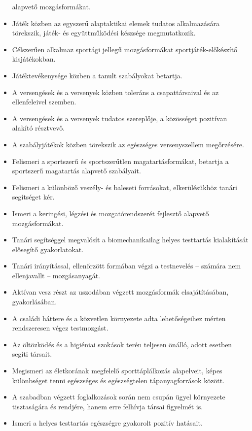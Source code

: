 \begin{itemize}
  alapvető mozgásformákat.
\item
  Játék közben az egyszerű alaptaktikai elemek tudatos alkalmazására
  törekszik, játék- és együttműködési készsége megmutatkozik.
\item
  Célszerűen alkalmaz sportági jellegű mozgásformákat
  sportjáték-előkészítő kisjátékokban.
\item
  Játéktevékenysége közben a tanult szabályokat betartja.
\item
  A versengések és a versenyek közben toleráns a csapattársaival és az
  ellenfeleivel szemben.
\item
  A versengések és a versenyek tudatos szereplője, a közösséget
  pozitívan alakító résztvevő.
\item
  A szabályjátékok közben törekszik az egészséges versenyszellem
  megőrzésére.
\item
  Felismeri a sportszerű és sportszerűtlen magatartásformákat, betartja
  a sportszerű magatartás alapvető szabályait.
\item
  Felismeri a különböző veszély- és baleseti forrásokat, elkerülésükhöz
  tanári segítséget kér.
\item
  Ismeri a keringési, légzési és mozgatórendszerét fejlesztő alapvető
  mozgásformákat.
\item
  Tanári segítséggel megvalósít a biomechanikailag helyes testtartás
  kialakítását elősegítő gyakorlatokat.
\item
  Tanári irányítással, ellenőrzött formában végzi a testnevelés --
  számára nem ellenjavallt -- mozgásanyagát.
\item
  Aktívan vesz részt az uszodában végzett mozgásformák elsajátításában,
  gyakorlásában.
\item
  A családi háttere és a közvetlen környezete adta lehetőségeihez mérten
  rendszeresen végez testmozgást.
\item
  Az öltözködés és a higiéniai szokások terén teljesen önálló, adott
  esetben segíti társait.
\item
  Megismeri az életkorának megfelelő sporttáplálkozás alapelveit, képes
  különbséget tenni egészséges és egészségtelen tápanyagforrások között.
\item
  A szabadban végzett foglalkozások során nem csupán ügyel környezete
  tisztaságára és rendjére, hanem erre felhívja társai figyelmét is.
\item
  Ismeri a helyes testtartás egészségre gyakorolt pozitív hatásait.
\end{itemize}

